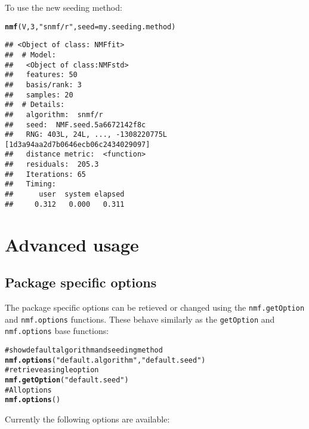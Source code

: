 \documentclass[a4paper]{article}\usepackage{graphicx, color}
\makeatletter
\newcommand{\hlfunctioncall}[1]{\textcolor[rgb]{0.501960784313725,0,0.329411764705882}{\textbf{#1}}}%
\newcommand{\hlstring}[1]{\textcolor[rgb]{0.6,0.6,1}{#1}}%
\newcommand{\hlcomment}[1]{\textcolor[rgb]{0.180392156862745,0.6,0.341176470588235}{#1}}%
\newenvironment{kframe}{%
 \def\at@end@of@kframe{}%
 \ifinner\ifhmode%
  \def\at@end@of@kframe{\end{minipage}}%
  \begin{minipage}{\columnwidth}%
 \fi\fi%
 \def\FrameCommand##1{\hskip\@totalleftmargin \hskip-\fboxsep
 \colorbox{shadecolor}{##1}\hskip-\fboxsep
     \hskip-\linewidth \hskip-\@totalleftmargin \hskip\columnwidth}%
 \MakeFramed {\advance\hsize-\width
   \@totalleftmargin\z@ \linewidth\hsize
   \@setminipage}}%
 {\par\unskip\endMakeFramed%
 \at@end@of@kframe}
\newenvironment{knitrout}{}{} %
\let\code=\texttt
\makeatother
\begin{document}
To use the new seeding method:
\begin{knitrout}
\color{fgcolor}\begin{kframe}
\begin{alltt}
\hlfunctioncall{nmf}(V, 3, \hlstring{"snmf/r"}, seed = my.seeding.method)
\end{alltt}
\begin{verbatim}
## <Object of class: NMFfit>
##  # Model:
##   <Object of class:NMFstd>
##   features: 50 
##   basis/rank: 3 
##   samples: 20 
##  # Details:
##   algorithm:  snmf/r 
##   seed:  NMF.seed.5a6672142f8c 
##   RNG: 403L, 24L, ..., -1308220775L [1d3a94aa2d7b0646ecb06c2434029097]
##   distance metric:  <function> 
##   residuals:  205.3 
##   Iterations: 65 
##   Timing:
##      user  system elapsed 
##     0.312   0.000   0.311
\end{verbatim}
\end{kframe}
\end{knitrout}


\section{Advanced usage}

\subsection{Package specific options}
The package specific options can be retieved or changed using the \code{nmf.getOption} and \code{nmf.options} functions. 
These behave similarly as the \code{getOption} and \code{nmf.options} base functions:

\begin{knitrout}
\color{fgcolor}\begin{kframe}
\begin{alltt}
\hlcomment{# show default algorithm and seeding method}
\hlfunctioncall{nmf.options}(\hlstring{"default.algorithm"}, \hlstring{"default.seed"})
\hlcomment{# retrieve a single option}
\hlfunctioncall{nmf.getOption}(\hlstring{"default.seed"})
\hlcomment{# All options}
\hlfunctioncall{nmf.options}()
\end{alltt}
\end{kframe}
\end{knitrout}


Currently the following options are available:
\end{document}
